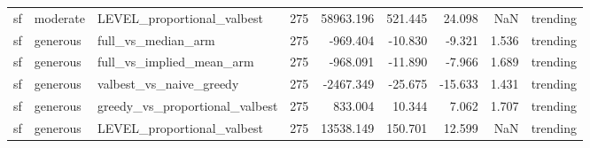 \begin{tabular}{lllrrrrrl}
sf & moderate & LEVEL\_proportional\_valbest & 275 & 58963.196 & 521.445 & 24.098 & NaN & trending \\
sf & generous & full\_vs\_median\_arm & 275 & -969.404 & -10.830 & -9.321 & 1.536 & trending \\
sf & generous & full\_vs\_implied\_mean\_arm & 275 & -968.091 & -11.890 & -7.966 & 1.689 & trending \\
sf & generous & valbest\_vs\_naive\_greedy & 275 & -2467.349 & -25.675 & -15.633 & 1.431 & trending \\
sf & generous & greedy\_vs\_proportional\_valbest & 275 & 833.004 & 10.344 & 7.062 & 1.707 & trending \\
sf & generous & LEVEL\_proportional\_valbest & 275 & 13538.149 & 150.701 & 12.599 & NaN & trending \\
\bottomrule
\end{tabular}
